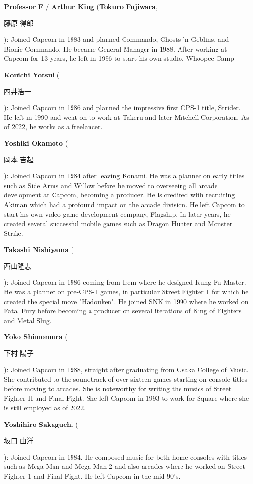 \textbf{Professor F} / \textbf{Arthur King} (\textbf{Tokuro Fujiwara}, \begin{CJK}{UTF8}{min}藤原 得郎\end{CJK}): Joined Capcom in 1983 and planned Commando, Ghosts 'n Goblins, and Bionic Commando. He became General Manager in 1988. After working at Capcom for 13 years, he left in 1996 to start his own studio, Whoopee Camp.

\textbf{Kouichi Yotsui} (\begin{CJK}{UTF8}{min}四井浩一\end{CJK}): Joined Capcom in 1986 and planned the impressive first CPS-1 title, Strider. He left in 1990 and went on to work at Takeru and later Mitchell Corporation. As of 2022, he works as a freelancer.

\textbf{Yoshiki Okamoto} (\begin{CJK}{UTF8}{min}岡本 吉起\end{CJK}): Joined Capcom in 1984 after leaving Konami. He was a planner on early titles such as Side Arms and Willow before he moved to overseeing all arcade development at Capcom, becoming a producer. He is credited with recruiting Akiman which had a profound impact on the arcade division. He left Capcom to start his own video game development company, Flagship. In later years, he created several successful mobile games such as Dragon Hunter and Monster Strike.   

\textbf{Takashi Nishiyama} (\begin{CJK}{UTF8}{min}西山隆志\end{CJK}): Joined Capcom in 1986 coming from Irem where he designed Kung-Fu Master. He was a planner on pre-CPS-1 games, in particular Street Fighter 1 for which he created the special move "Hadouken". He joined SNK in 1990 where he worked on Fatal Fury before becoming a producer on several iterations of King of Fighters and Metal Slug.


\textbf{Yoko Shimomura} (\begin{CJK}{UTF8}{min}下村 陽子\end{CJK}): Joined Capcom in 1988, straight after graduating from Osaka College of Music. She contributed to the soundtrack of over sixteen games starting on console titles before moving to arcades. She is noteworthy for writing the musics of Street Fighter II and Final Fight. She left Capcom in 1993 to work for Square where she is still employed as of 2022.

\textbf{Yoshihiro Sakaguchi} (\begin{CJK}{UTF8}{min}坂口 由洋\end{CJK}): Joined Capcom in 1984. He composed music for both home consoles with titles such as Mega Man and Mega Man 2 and also arcades where he worked on Street Fighter 1 and Final Fight. He left Capcom in the mid 90's.